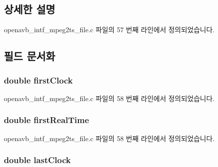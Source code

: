 \subsection{상세한 설명}


openavb\+\_\+intf\+\_\+mpeg2ts\+\_\+file.\+c 파일의 57 번째 라인에서 정의되었습니다.



\subsection{필드 문서화}
\subsubsection[{\texorpdfstring{first\+Clock}{firstClock}}]{\setlength{\rightskip}{0pt plus 5cm}double first\+Clock}\hypertarget{struct_p_i_d_status_ad303774d67c02cb29ec6ab6f1f1ce58b}{}\label{struct_p_i_d_status_ad303774d67c02cb29ec6ab6f1f1ce58b}


openavb\+\_\+intf\+\_\+mpeg2ts\+\_\+file.\+c 파일의 58 번째 라인에서 정의되었습니다.

\subsubsection[{\texorpdfstring{first\+Real\+Time}{firstRealTime}}]{\setlength{\rightskip}{0pt plus 5cm}double first\+Real\+Time}\hypertarget{struct_p_i_d_status_ab7ee7fd4a6e91c0e09612b85e580f417}{}\label{struct_p_i_d_status_ab7ee7fd4a6e91c0e09612b85e580f417}


openavb\+\_\+intf\+\_\+mpeg2ts\+\_\+file.\+c 파일의 58 번째 라인에서 정의되었습니다.

\subsubsection[{\texorpdfstring{last\+Clock}{lastClock}}]{\setlength{\rightskip}{0pt plus 5cm}double last\+Clock}\hypertarget{struct_p_i_d_status_a4f3001d09b4b04251fffd4f8908ca24a}{}\label{struct_p_i_d_status_a4f3001d09b4b04251fffd4f8908ca24a}


